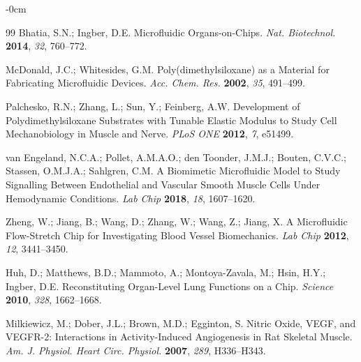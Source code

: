 \documentclass[materials,article,submit,moreauthors,pdftex]{Definitions/mdpi}
\begin{document}
\begin{adjustwidth}{-\extralength}{0cm}
\begin{thebibliography}{99}
Bhatia, S.N.; Ingber, D.E. Microfluidic Organs-on-Chips. \textit{Nat. Biotechnol.} \textbf{2014}, \textit{32}, 760–772.

McDonald, J.C.; Whitesides, G.M. Poly(dimethylsiloxane) as a Material for Fabricating Microfluidic Devices. \textit{Acc. Chem. Res.} \textbf{2002}, \textit{35}, 491–499.

Palchesko, R.N.; Zhang, L.; Sun, Y.; Feinberg, A.W. Development of Polydimethylsiloxane Substrates with Tunable Elastic Modulus to Study Cell Mechanobiology in Muscle and Nerve. \textit{PLoS ONE} \textbf{2012}, \textit{7}, e51499.

van Engeland, N.C.A.; Pollet, A.M.A.O.; den Toonder, J.M.J.; Bouten, C.V.C.; Stassen, O.M.J.A.; Sahlgren, C.M. A Biomimetic Microfluidic Model to Study Signalling Between Endothelial and Vascular Smooth Muscle Cells Under Hemodynamic Conditions. \textit{Lab Chip} \textbf{2018}, \textit{18}, 1607–1620.

Zheng, W.; Jiang, B.; Wang, D.; Zhang, W.; Wang, Z.; Jiang, X. A Microfluidic Flow-Stretch Chip for Investigating Blood Vessel Biomechanics. \textit{Lab Chip} \textbf{2012}, \textit{12}, 3441–3450.

Huh, D.; Matthews, B.D.; Mammoto, A.; Montoya-Zavala, M.; Hsin, H.Y.; Ingber, D.E. Reconstituting Organ-Level Lung Functions on a Chip. \textit{Science} \textbf{2010}, \textit{328}, 1662–1668.

Milkiewicz, M.; Dober, J.L.; Brown, M.D.; Egginton, S. Nitric Oxide, VEGF, and VEGFR-2: Interactions in Activity-Induced Angiogenesis in Rat Skeletal Muscle. \textit{Am. J. Physiol. Heart Circ. Physiol.} \textbf{2007}, \textit{289}, H336–H343.

\end{thebibliography}

\end{adjustwidth}
\end{document}
